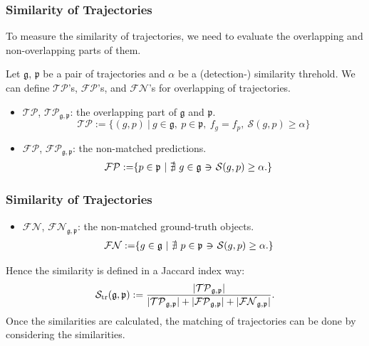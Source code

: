 \documentclass[slidetop, mathserif]{beamer}
\newcommand{\suchthat}{-\hspace{-10pt}\ni\hspace{-10pt}-}
\begin{document}
\begin{frame}
	\frametitle{Similarity of Trajectories}
	
	To measure the similarity of trajectories, we need to evaluate the 
	overlapping and non-overlapping parts of them.
	
	\vspace{4pt}
	
	Let $\mathfrak g$, $\mathfrak p$ be a pair of trajectories
	and $\alpha$ be a (detection-) similarity threhold.
	We can define $\mathcal{TP}$'s, $\mathcal{FP}$'s, and $\mathcal{FN}$'s for overlapping of trajectories.
	\begin{itemize}
		\item $\mathcal{TP}$, $\mathcal{TP}_{\mathfrak g, \mathfrak p}$:
		      the overlapping part of $\mathfrak g$ and $\mathfrak p$.
		      \[
		      	\mathcal{TP} := \{(g,p)\ |\ 
		      	g\in\mathfrak g,~
		      	p\in\mathfrak p,~
		      	f_g=f_p,~ \mathcal S(g,p)\geq \alpha\}
		      \]
		\item $\mathcal{FP}$, $\mathcal{FP}_{\mathfrak g, \mathfrak p}$:
		      the non-matched predictions.
		      \begin{align*}
		      	\mathcal{FP} := & \{ p\in\mathfrak p\ |\ 
		      	\nexists\ g\in\mathfrak g ~\suchthat~ \mathcal S(g,p)\geq\alpha.\}
		      \end{align*}
	\end{itemize}
	
\end{frame}

\begin{frame}
	\frametitle{Similarity of Trajectories}
	
	\begin{itemize}
		\item $\mathcal{FN}$, $\mathcal{FN}_{\mathfrak g, \mathfrak p}$: the non-matched ground-truth objects.
		      \begin{align*}
		      	\mathcal{FN} := & \{ g\in\mathfrak g\ |\ 
		      	\nexists\ p\in\mathfrak p ~\suchthat~ \mathcal S(g,p)\geq\alpha.\}
		      \end{align*}
	\end{itemize}
	
	Hence the similarity is defined in a Jaccard index way:
	\[
		\mathcal S_{\rm tr}(\mathfrak g, \mathfrak p) :=
		\dfrac{|\mathcal{TP}_{\mathfrak g,\mathfrak p}|}{
			|\mathcal{TP}_{\mathfrak g,\mathfrak p}|+|\mathcal{FP}_{\mathfrak g,\mathfrak p}|+|\mathcal{FN}_{\mathfrak g,\mathfrak p}|
		}.
	\]
	Once the similarities are calculated,
	the matching of trajectories can be done by considering the similarities.
\end{frame}
\end{document}
